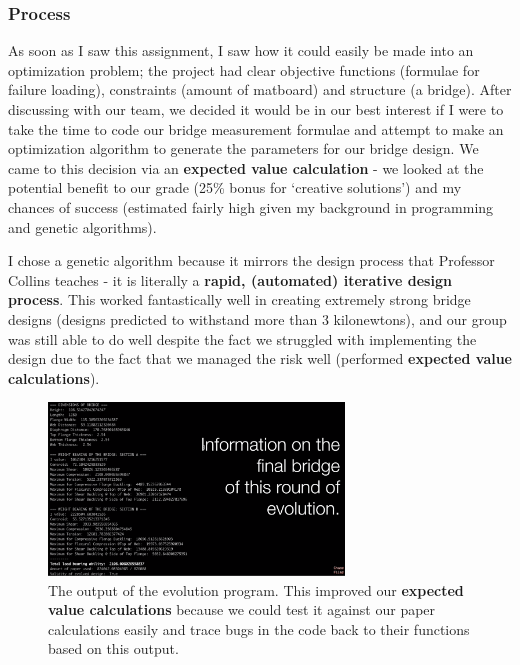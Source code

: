 \documentclass[a4paper,12pt]{article}
\begin{document}
\subsubsection{Process}

As soon as I saw this assignment, I saw how it could easily be made into an optimization problem; the project had clear objective functions (formulae for failure loading), constraints (amount of matboard) and structure (a bridge). After discussing with our team, we decided it would be in our best interest if I were to take the time to code our bridge measurement formulae and attempt to make an optimization algorithm to generate the parameters for our bridge design. We came to this decision via an \textbf{expected value calculation} - we looked at the potential benefit to our grade (25\% bonus for ‘creative solutions’) and my chances of success (estimated fairly high given my background in programming and genetic algorithms).

I chose a genetic algorithm because it mirrors the design process that Professor Collins teaches - it is literally a \textbf{rapid, (automated) iterative design process}. This worked fantastically well in creating extremely strong bridge designs (designs predicted to withstand more than 3 kilonewtons), and our group was still able to do well despite the fact we struggled with implementing the design due to the fact that we managed the risk well (performed \textbf{expected value calculations}).

\begin{figure}[H]
\centering
\includegraphics[width=0.7\textwidth]{img/image005.png}
\caption{The output of the evolution program. This improved our \textbf{expected value calculations} because we could test it against our paper calculations easily and trace bugs in the code back to their functions based on this output.}
\label{}
\end{figure}
\end{document}
